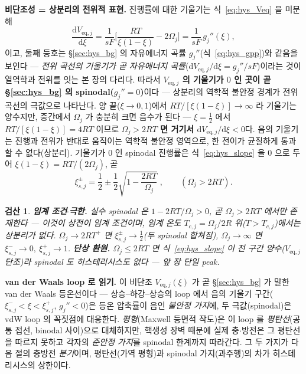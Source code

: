 \documentclass[11pt,a4paper]{article}
\newtheorem*{verifybox}{검산}
\newcommand{\dd}{\mathrm{d}}
\newcommand{\eq}{\mathrm{eq}}
\begin{document}
\textbf{비단조성 = 상분리의 전위적 표현.} 진행률에 대한 기울기는 식~\eqref{eq:hys_Veq} 을 미분해
\begin{equation}
\frac{\dd V_{\eq,j}}{\dd\xi}=\frac{1}{sF}\Big[\frac{RT}{\xi(1-\xi)}-2\Omega_j\Big]=\frac{1}{sF}\,g_j''(\xi),
\label{eq:hys_slope}
\end{equation}
이고, 둘째 등호는 \S\ref{sec:hys_bg} 의 자유에너지 곡률 $g_j''$(식~\eqref{eq:hys_gpp})와 같음을 보인다 —
\emph{전위 곡선의 기울기가 곧 자유에너지 곡률}($\dd V_{\eq,j}/\dd\xi=g_j''/sF$)이라는 것이 열역학과 전위를 잇는
본 장의 다리다.
따라서 \textbf{$V_{\eq,j}$ 의 기울기가 $0$ 인 곳이 곧 \S\ref{sec:hys_bg} 의 spinodal($g_j''=0$)}이다 — 상분리의
역학적 불안정 경계가 전위 곡선의 극값으로 나타난다. 양 끝($\xi\to0,1$)에서
$RT/[\xi(1-\xi)]\to\infty$ 라 기울기는 양수지만, 중간에서 $\Omega_j$ 가 충분히 크면 음수가 된다 —
$\xi=\tfrac12$ 에서 $RT/[\xi(1-\xi)]=4RT$ 이므로 \textbf{$\Omega_j>2RT$ 면 거기서 $\dd V_{\eq,j}/\dd\xi<0$}다.
음의 기울기는 진행과 전위가 반대로 움직이는 역학적 불안정 영역으로, 한 전이가 균질하게 통과할 수 없다(상분리).
기울기가 $0$ 인 spinodal 진행률은 식~\eqref{eq:hys_slope} 을 $0$ 으로 두어 $\xi(1-\xi)=RT/(2\Omega_j)$, 곧
\begin{equation}
\boxed{\;\xi_{s,j}^\pm=\frac12\pm\frac12\sqrt{1-\frac{2RT}{\Omega_j}}\;,\qquad(\Omega_j>2RT).\;}
\label{eq:hys_spinodal}
\end{equation}
\begin{verifybox}
\textbf{임계 조건$\cdot$극한.} 실수 spinodal 은 $1-2RT/\Omega_j>0$, 곧 $\Omega_j>2RT$ 에서만 존재한다 — 이것이
상전이 임계 조건이며, 임계 온도 $T_{c,j}=\Omega_j/2R$ 위($T>T_{c,j}$)에서는 상분리가 없다. $\Omega_j\to2RT^+$
면 $\xi_{s,j}^\pm\to\tfrac12$(두 spinodal 합쳐짐), $\Omega_j\to\infty$ 면 $\xi_{s,j}^-\to0,\ \xi_{s,j}^+\to1$.
\textbf{단상 환원.} $\Omega_j\le2RT$ 면 식~\eqref{eq:hys_slope} 이 전 구간 양수($V_{\eq,j}$ 단조)라 spinodal 도
히스테리시스도 없다 — 앞 장 단일 peak.
\end{verifybox}

\textbf{van der Waals loop 로 읽기.} 이 비단조 $V_{\eq,j}(\xi)$ 가 곧 \S\ref{sec:hys_bg} 가 말한 van der Waals
등온선이다 — 상승--하강--상승의 loop 에서 음의 기울기 구간($\xi_{s,j}^-<\xi<\xi_{s,j}^+$, $g_j''<0$)은 등온
압축률이 음인 \emph{불안정 가지}에, 두 극값(spinodal)은 vdW loop 의 꼭짓점에 대응한다. \emph{평형}(Maxwell 등면적
작도)은 이 loop 를 \emph{평탄선}(공통 접선, binodal 사이)으로 대체하지만, 핵생성 장벽 때문에 실제 충$\cdot$방전은
그 평탄선을 따르지 못하고 각자의 \emph{준안정 가지}를 spinodal 한계까지 따라간다. 그 두 가지가 다음 절의 충방전
\emph{분기}이며, 평탄선(가역 평형)과 spinodal 가지(과주행)의 차가 히스테리시스의 상한이다.
\end{document}
